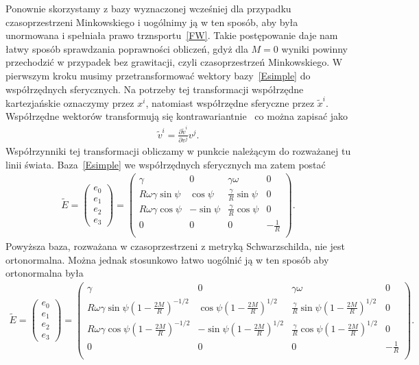 Ponownie skorzystamy z bazy wyznaczonej wcześniej dla przypadku
czasoprzestrzeni Minkowskiego i uogólnimy ją w ten sposób, 
aby była unormowana i spełniała prawo trznsportu~\eqref{FW}.
Takie postępowanie daje nam łatwy sposób sprawdzania poprawności
obliczeń, gdyż dla $M=0$ wyniki powinny przechodzić w przypadek 
bez grawitacji, czyli czasoprzestrzeń Minkowskiego.
W pierwszym kroku musimy przetransformować wektory bazy~\eqref{Esimple}
do współrzędnych sferycznych.  Na potrzeby tej transformacji
współrzędne kartezjańskie oznaczymy przez $x^i$, natomiast współrzędne 
sferyczne przez $\tilde{x}^i$. Współrzędne wektorów transformują 
się kontrawariantnie~\cite{inga1980} co można zapisać jako
\begin{align}\nonumber
\tilde{v}^i = \frac{\partial \tilde{v}^i}{\partial v^j} v^j.
\end{align}
Współrzynniki tej transformacji obliczamy w punkcie należącym do 
rozważanej tu linii świata. Baza~\eqref{Esimple} we współrzędnych sferycznych
ma zatem postać 
\begin{align}\nonumber
\widetilde{E}=
\begin{pmatrix}
e_0\\
e_1\\
e_2\\
e_3
\end{pmatrix}
=
\begin{pmatrix}
\gamma & 0 & \gamma \omega & 0 \\
R\omega\gamma \sin \psi & \cos\psi & \frac{\gamma}{R} \sin\psi & 0\\
R\omega\gamma \cos \psi & -\sin\psi & \frac{\gamma}{R} \cos\psi & 0\\
0 & 0 & 0 & -\frac{1}{R} \\
\end{pmatrix}.
\end{align}
Powyższa baza, rozważana w czasoprzestrzeni z metryką
Schwarzschilda, nie jest ortonormalna. Można jednak stosunkowo łatwo
uogólnić ją w ten sposób aby ortonormalna była
\begin{align}\nonumber
\widetilde{E}=
\begin{pmatrix}
e_0\\
e_1\\
e_2\\
e_3
\end{pmatrix}
=
\begin{pmatrix}
\gamma & 0 & \gamma \omega & 0 \\
R\omega\gamma \sin \psi \left(1-\frac{2 M}{R} \right)^{-1/2} 
& \cos\psi\left(1-\frac{2 M}{R} \right)^{1/2} 
& \frac{\gamma}{R} \sin\psi\left(1-\frac{2 M}{R} \right)^{1/2} & 0\\
R\omega\gamma \cos \psi\left(1-\frac{2 M}{R} \right)^{-1/2} 
& -\sin\psi \left(1-\frac{2 M}{R} \right)^{1/2}
& \frac{\gamma}{R} \cos\psi \left(1-\frac{2 M}{R} \right)^{1/2}& 0\\
0 & 0 & 0 & -\frac{1}{R} \\
\end{pmatrix}.
\end{align}
